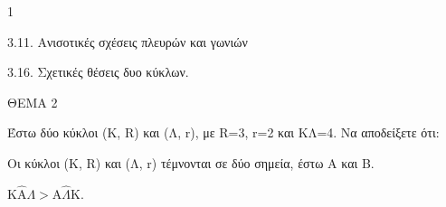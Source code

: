 \begin{ylh}{1}
    \item 3.11. Ανισοτικές σχέσεις πλευρών και γωνιών
    \item 3.16. Σχετικές θέσεις δυο κύκλων.
\end{ylh}

ΘΕΜΑ 2

Έστω δύο κύκλοι (Κ, R) και (Λ, r), με R=3, r=2 και ΚΛ=4. Να αποδείξετε ότι:

\begin{alist}
\item Οι κύκλοι (Κ, R) και (Λ, r) τέμνονται σε δύο σημεία, έστω Α και Β.


\item $\text{K}\widehat{\text{A}}\Lambda > \text{A}\widehat{\Lambda}\text{K}$.

\end{alist}
